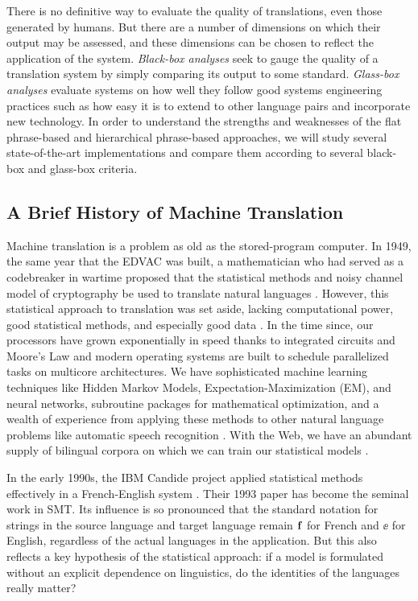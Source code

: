 \documentclass[11pt]{article}
\begin{document}
There is no definitive way to evaluate the quality of translations, even those generated by humans.
But there are a number of dimensions on which their output may be assessed, and these dimensions
can be chosen to reflect the application of the system.
\textit{Black-box analyses} seek to gauge the quality of a translation system by simply comparing its output
to some standard.
\textit{Glass-box analyses} evaluate systems on how well they follow good systems engineering practices 
such as how easy it is to extend to other language pairs and incorporate new technology.
In order to understand the strengths and weaknesses of the flat phrase-based and hierarchical phrase-based approaches,
we will study several state-of-the-art implementations and compare them according to several black-box and glass-box criteria.


\subsection{A Brief History of Machine Translation}

Machine translation is a problem as old as the stored-program computer. In 1949, the same
year that the EDVAC was built,
a mathematician who had served as a codebreaker in wartime
proposed that the statistical methods and noisy channel model of cryptography
be used to translate natural languages \cite{weaver_memo}.
However, this statistical approach to translation was set aside, 
lacking computational power, good statistical methods, and especially good data \cite{lopez}. 
In the time since, our processors have grown exponentially in speed thanks to integrated circuits and Moore's Law
and modern operating systems are built to schedule parallelized tasks on multicore architectures.
We have sophisticated machine learning techniques like Hidden Markov Models,
Expectation-Maximization (EM), and neural networks, 
subroutine packages for mathematical optimization, and a wealth of experience from
applying these methods to other natural language problems like automatic speech recognition \cite{brown:93, och:99}.
With the Web, we have an abundant supply of bilingual corpora on which we can train our statistical models \cite{lopez}.

In the early 1990s, the IBM Candide project applied statistical methods effectively in a French-English
system \cite{brown:93}. Their 1993 paper has become the seminal work in SMT.
Its influence is so pronounced that the standard notation for strings in the source language and target language remain $\mathbf{f}$ for French
and $\ee$ for English, regardless of the actual languages in the application.
But this also reflects a key hypothesis of the statistical approach: if a model is formulated without
an explicit dependence on linguistics, do the identities of the languages really matter?
\end{document}
